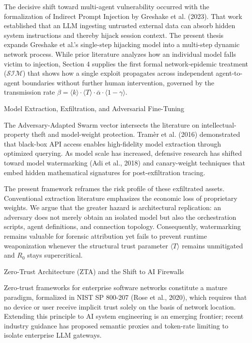 The decisive shift toward multi-agent vulnerability occurred with the formalization of Indirect Prompt Injection by Greshake et al. (2023). That work established that an LLM ingesting untrusted external data can absorb hidden system instructions and thereby hijack session context. The present thesis expands Greshake et al.’s single-step hijacking model into a multi-step dynamic network process. While prior literature analyzes how an individual model falls victim to injection, Section 4 supplies the first formal network-epidemic treatment (\(\mathcal{S}\mathcal{I}\mathcal{M}\)) that shows how a single exploit propagates across independent agent-to-agent boundaries without further human intervention, governed by the transmission rate \(\beta = \langle k \rangle \cdot \langle T \rangle \cdot \bar{\alpha} \cdot \langle 1 - \gamma \rangle\).

Model Extraction, Exfiltration, and Adversarial Fine-Tuning

The Adversary-Adapted Swarm vector intersects the literature on intellectual-property theft and model-weight protection. Tramèr et al. (2016) demonstrated that black-box API access enables high-fidelity model extraction through optimized querying. As model scale has increased, defensive research has shifted toward model watermarking (Adi et al., 2018) and canary-weight techniques that embed hidden mathematical signatures for post-exfiltration tracing.

The present framework reframes the risk profile of these exfiltrated assets. Conventional extraction literature emphasizes the economic loss of proprietary weights. We argue that the greater hazard is architectural replication: an adversary does not merely obtain an isolated model but also the orchestration scripts, agent definitions, and connection topology. Consequently, watermarking remains valuable for forensic attribution yet fails to prevent runtime weaponization whenever the structural trust parameter \(\langle T \rangle\) remains unmitigated and \(R_0\) stays supercritical.

Zero-Trust Architecture (ZTA) and the Shift to AI Firewalls

Zero-trust frameworks for enterprise software networks constitute a mature paradigm, formalized in NIST SP 800-207 (Rose et al., 2020), which requires that no device or user receive implicit trust solely on the basis of network location. Extending this principle to AI system engineering is an emerging frontier; recent industry guidance has proposed semantic proxies and token-rate limiting to isolate enterprise LLM gateways.

